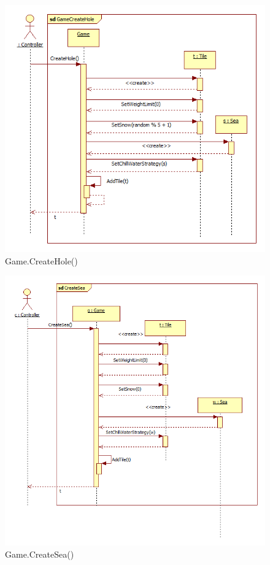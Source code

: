 \begin{figure}[H]
	\begin{center}
		\includegraphics[width=15cm]{chapters/chapter03/seqdiag/Game_CreateHole.png}
		\caption{Game.CreateHole()}
		\label{fig:GameCreateHole}
	\end{center}
\end{figure}
\begin{figure}[H]
	\begin{center}
		\includegraphics[width=13cm]{chapters/chapter03/seqdiag/Game_CreateSea.png}
		\caption{Game.CreateSea()}
		\label{fig:GameCreateSea}
	\end{center}
\end{figure}
